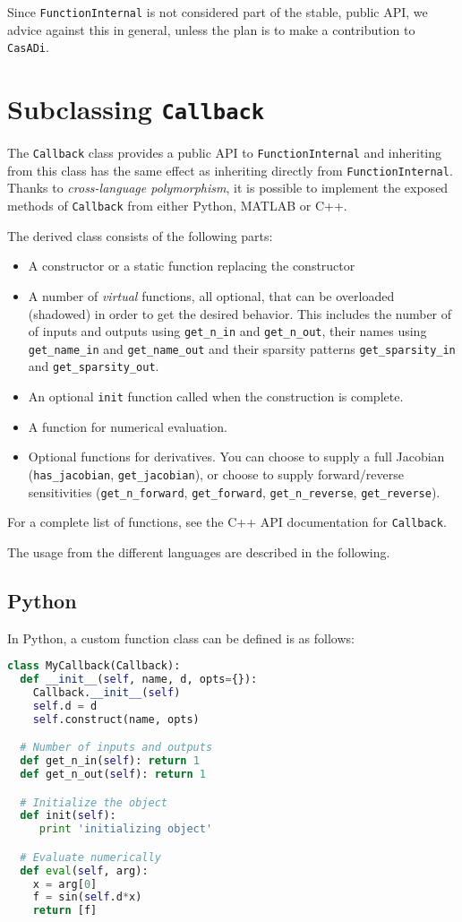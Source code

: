 \documentclass[a4paper,12pt]{book}
\newcommand{\CasADi}{\texttt{CasADi}\xspace}
\begin{document}
Since \texttt{FunctionInternal} is not considered part of the stable, public API,
we advice against this in general, unless the plan is to make a contribution to \CasADi.

\section{Subclassing \texttt{Callback}}
The \texttt{Callback} class provides a public API to \texttt{FunctionInternal}
and inheriting from this class has the same effect as inheriting directly from
\texttt{FunctionInternal}. Thanks to \emph{cross-language polymorphism}, it
is possible to implement the exposed methods of \texttt{Callback} from either
Python, MATLAB or C++.

The derived class consists of the following parts:
\begin{itemize}
  \item A constructor or a static function replacing the constructor
  \item A number of \emph{virtual} functions, all optional, that can be overloaded
  (shadowed) in order to get the desired behavior. This includes the number of
  of inputs and outputs using \verb|get_n_in| and \verb|get_n_out|,
  their names using \verb|get_name_in| and \verb|get_name_out|
  and their sparsity patterns \verb|get_sparsity_in| and \verb|get_sparsity_out|.
  \item An optional \verb|init| function called when the construction is complete.
  \item A function for numerical evaluation.
  \item Optional functions for derivatives. You can choose to supply a full Jacobian (\verb|has_jacobian|, \verb|get_jacobian|), or choose to supply forward/reverse sensitivities (\verb|get_n_forward|, \verb|get_forward|,  \verb|get_n_reverse|, \verb|get_reverse|).
\end{itemize}

For a complete list of functions, see the C++ API documentation for
\texttt{Callback}.

The usage from the different languages are described in the following.

\subsection*{Python}
In Python, a custom function class can be defined is as follows:
\begin{lstlisting}[language=Python]
class MyCallback(Callback):
  def __init__(self, name, d, opts={}):
    Callback.__init__(self)
    self.d = d
    self.construct(name, opts)

  # Number of inputs and outputs
  def get_n_in(self): return 1
  def get_n_out(self): return 1

  # Initialize the object
  def init(self):
     print 'initializing object'

  # Evaluate numerically
  def eval(self, arg):
    x = arg[0]
    f = sin(self.d*x)
    return [f]
\end{lstlisting}
\end{document}
